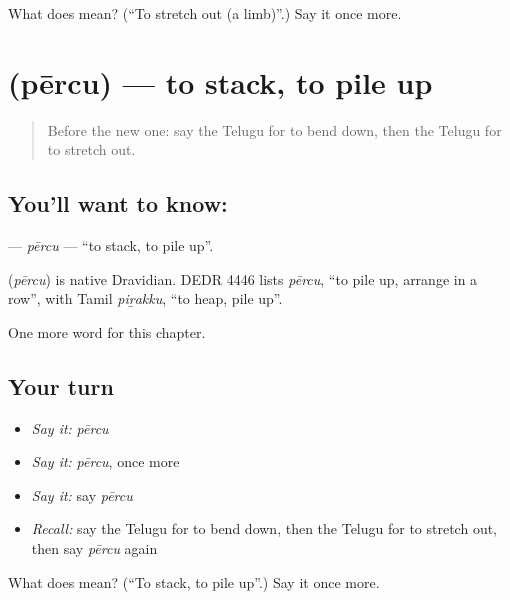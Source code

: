 \begin{tcolorbox}[breakable,colback=teal!4,colframe=teal!35!black,title={Before you move on}]
What does  mean? (\textquotedblleft{}To stretch out (a limb)\textquotedblright{}.) Say it once more.
\end{tcolorbox}
\section[\texorpdfstring{\te{పేర్చు} (pērcu)}{పేర్చు (pērcu)}]{ (pērcu) — to stack, to pile up}

\label{lesson:TE-C249-percu}



\begin{quote}
Before the new one: say the Telugu for to bend down, then the Telugu for to stretch out.
\end{quote}

\subsection*{You'll want to know: }
\textbf{} — \emph{pērcu} — \textquotedblleft{}to stack, to pile up\textquotedblright{}.

\begin{cousinweb}
\textbf{} (\emph{pērcu}) is native Dravidian. DEDR 4446 lists \emph{pērcu}, \textquotedblleft{}to pile up, arrange in a row\textquotedblright{}, with Tamil \emph{piṟakku}, \textquotedblleft{}to heap, pile up\textquotedblright{}.
\end{cousinweb}

\begin{grammarlens}[title={What you've built}]
One more word for this chapter.
\end{grammarlens}

\subsection*{Your turn}
\begin{itemize}
\raggedright
  \item \emph{Say it:} \emph{pērcu}
  \item \emph{Say it:} \emph{pērcu}, once more
  \item \emph{Say it:} say \emph{pērcu}
  \item \emph{Recall:} say the Telugu for to bend down, then the Telugu for to stretch out, then say \emph{pērcu} again
\end{itemize}

\begin{tcolorbox}[breakable,colback=teal!4,colframe=teal!35!black,title={Before you move on}]
What does  mean? (\textquotedblleft{}To stack, to pile up\textquotedblright{}.) Say it once more.
\end{tcolorbox}
